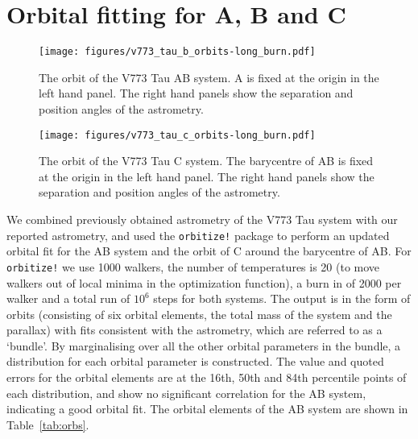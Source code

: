 \documentclass{aa}
\begin{document}
\section{Orbital fitting for A, B and C}\label{sec:orbitalfit}

\begin{figure*}[ht]
\begin{center}
    \centering
    \texttt{[image: figures/v773\_tau\_b\_orbits-long\_burn.pdf]}
        \caption{The orbit of the V773 Tau AB system.
        A is fixed at the origin in the left hand panel.
        The right hand panels show the separation and position angles of the astrometry.}
      \label{fig:v773orbitize}
\end{center}
\end{figure*}

\begin{figure*}[ht]
\begin{center}
    \centering
    \texttt{[image: figures/v773\_tau\_c\_orbits-long\_burn.pdf]}
        \caption{The orbit of the V773 Tau C system.
        The barycentre of AB is fixed at the origin in the left hand panel.
        The right hand panels show the separation and position angles of the astrometry.}
    \label{fig:v773Corbitize}
\end{center}
\end{figure*}


We combined previously obtained astrometry of the V773 Tau system \citep[from the analysis of ][]{Duchene03,Boden12} with our reported astrometry, and used the {\tt orbitize!} \citep{Blunt20,foreman-mackey2013} package to perform an updated orbital fit for the AB system and the orbit of C around the barycentre of AB.
%
For {\tt orbitize!} we use 1000 walkers, the number of temperatures is 20 (to move walkers out of local minima in the optimization function), a burn in of 2000 per walker and a total run of $10^6$ steps for both systems.
%
The output is in the form of orbits (consisting of six orbital elements, the total mass of the system and the parallax) with fits consistent with the astrometry, which are referred to as a `bundle'.
%
By marginalising over all the other orbital parameters in the bundle, a distribution for each orbital parameter is constructed.
%
The value and quoted errors for the orbital elements are at the 16th, 50th and 84th percentile points of each distribution, and show no significant correlation for the AB system, indicating a good orbital fit.
%
The orbital elements of the AB system are shown in Table~\ref{tab:orbs}.
\end{document}

